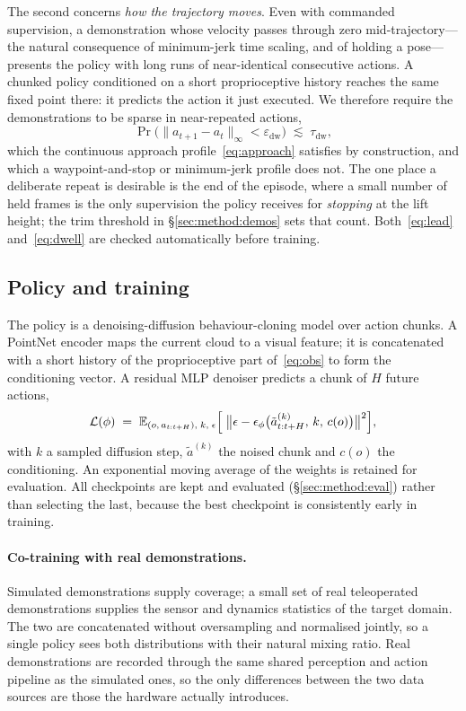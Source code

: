 The second concerns \emph{how the trajectory moves}. Even with commanded supervision, a
demonstration whose velocity passes through zero mid-trajectory---the natural consequence of
minimum-jerk time scaling, and of holding a pose---presents the policy with long runs of
near-identical consecutive actions. A chunked policy conditioned on a short proprioceptive
history reaches the same fixed point there: it predicts the action it just executed. We
therefore require the demonstrations to be sparse in near-repeated actions,
\begin{equation}
  \Pr\bigl(\lVert a_{t+1} - a_t \rVert_\infty < \varepsilon_{\text{dw}}\bigr)
    \;\lesssim\; \tau_{\text{dw}} ,
  \label{eq:dwell}
\end{equation}
which the continuous approach profile~\eqref{eq:approach} satisfies by construction, and
which a waypoint-and-stop or minimum-jerk profile does not. The one place a deliberate
repeat is desirable is the end of the episode, where a small number of held frames is the
only supervision the policy receives for \emph{stopping} at the lift height; the trim
threshold in \S\ref{sec:method:demos} sets that count. Both~\eqref{eq:lead}
and~\eqref{eq:dwell} are checked automatically before training.

\subsection{Policy and training}
\label{sec:method:policy}

The policy is a denoising-diffusion behaviour-cloning model over action chunks. A PointNet
encoder maps the current cloud to a visual feature; it is concatenated with a short history
of the proprioceptive part of~\eqref{eq:obs} to form the conditioning vector. A residual MLP
denoiser predicts a chunk of $H$ future actions,
\begin{equation}
  \mathcal{L}(\phi)\;=\;
  \mathbb{E}_{(o,\,a_{t:t+H}),\;k,\;\epsilon}
  \Bigl[\;\bigl\lVert \epsilon - \epsilon_\phi\bigl(\tilde a^{(k)}_{t:t+H},\,k,\,c(o)\bigr)\bigr\rVert^2\Bigr],
  \label{eq:bc}
\end{equation}
with $k$ a sampled diffusion step, $\tilde a^{(k)}$ the noised chunk and $c(o)$ the
conditioning. An exponential moving average of the weights is retained for evaluation. All
checkpoints are kept and evaluated (\S\ref{sec:method:eval}) rather than selecting the last,
because the best checkpoint is consistently early in training.

\paragraph{Co-training with real demonstrations.}
Simulated demonstrations supply coverage; a small set of real teleoperated demonstrations
supplies the sensor and dynamics statistics of the target domain. The two are concatenated
without oversampling and normalised jointly, so a single policy sees both distributions with
their natural mixing ratio. Real demonstrations are recorded through the same shared
perception and action pipeline as the simulated ones, so the only differences between the two
data sources are those the hardware actually introduces.

